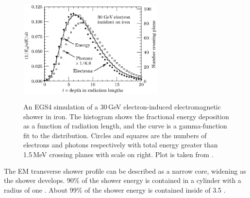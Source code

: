 

\begin{figure}[tbph]
\centering
{\includegraphics[width=0.65\textwidth]{photon/EMlong}}
\caption[Simulated longitudinal electromagnetic shower profile as a function of depth for electrons and photons.]
{An EGS4 \cite{Ford:1978jp,Hirayama:296198} simulation of a 30\,GeV electron-induced electromagnetic shower in iron. The histogram shows the fractional energy deposition as a function of radiation length, and the curve is a gamma-function fit to the distribution. Circles and squares are the numbers of electrons and photons respectively with total energy greater than 1.5\,MeV crossing planes with scale on right. Plot is taken from \cite{Agashe:2014kda}.}
\label{fig:photonEMlongProfile}
\end{figure}

The EM transverse shower profile can be described as  a narrow core,  widening as the shower develops. 90\% of the shower energy  is contained in a cylinder with a radius of one \RM. About 99\% of the shower energy  is contained inside of 3.5 \RM \cite{PhysRev.149.201,Bathow:1970dn}.





